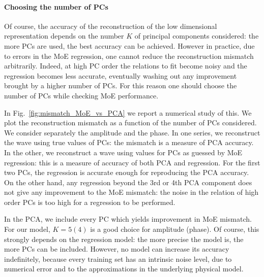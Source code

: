 \documentclass[twocolumn,showpacs,preprintnumbers,nofootinbib,prd,
superscriptaddress,10pt]{revtex4-1}
\begin{document}
\paragraph{Choosing the number of PCs}
Of course, the accuracy of the reconstruction of the low dimensional representation depends on the number $K$ of principal components considered: the more PCs are used, the best accuracy can be achieved.
However in practice, due to errors in the MoE regression, one cannot reduce the reconstruction mismatch
arbitrarily. Indeed, at high PC order the relations to fit become noisy and the regression becomes less accurate, eventually washing out any improvement brought by a higher number of PCs.
For this reason one should choose the number of PCs while checking MoE performance.

In Fig.~\ref{fig:mismatch_MoE_vs_PCA} we report a numerical study of this. We plot the reconstruction mismatch as a function of the number of PCs considered. We consider separately the amplitude and the phase. In one series, we reconstruct the wave using true values of PCs: the mismatch is a measure of PCA accuracy. In the other, we reconstruct a wave using values for PCs as guessed by MoE regression: this is a measure of accuracy of both PCA and regression.
For the first two PCs, the regression is accurate enough for reproducing the PCA accuracy.
On the other hand, any regression beyond the 3rd or 4th PCA component does not give any improvement to the MoE mismatch: the noise in the relation of high order PCs is too high for a regression to be performed.

In the PCA, we include every PC which yields improvement in MoE mismatch. For our model, $K = 5(4)$ is a good choice for amplitude (phase).
Of course, this strongly depends on the regression model: the more precise the model is, the more PCs can be included.
However, no model can increase its accuracy indefinitely, because every training set has an intrinsic noise level, due to numerical error and to the approximations in the underlying physical model.
\end{document}
